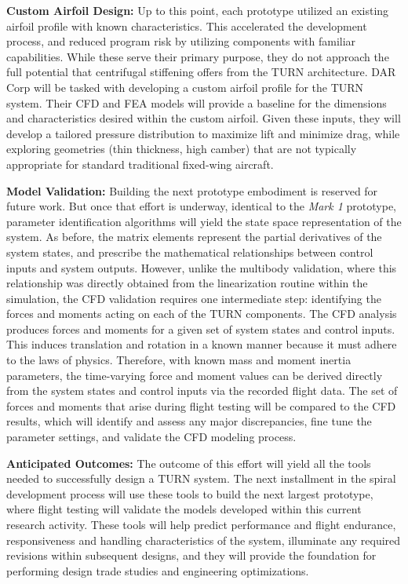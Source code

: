 \documentclass[11pt]{article}
\begin{document}
{\color{green} \bf Custom Airfoil Design:}
Up to this point, each prototype utilized an existing airfoil profile with known characteristics.  This accelerated the development process, and reduced program risk by utilizing components with familiar capabilities.  While these serve their primary purpose, they do not approach the full potential that centrifugal stiffening offers from the TURN architecture.  DAR Corp will be tasked with developing a custom airfoil profile for the TURN system.  Their CFD and FEA models will provide a baseline for the dimensions and characteristics desired within the custom airfoil.  Given these inputs, they will develop a tailored pressure distribution to maximize lift and minimize drag, while exploring geometries (thin thickness, high camber) that are not typically appropriate for standard traditional fixed-wing aircraft.


{\color{green} \bf Model Validation:}
Building the next prototype embodiment is reserved for future work.  But once that effort is underway, identical to the \emph{Mark 1} prototype, parameter identification algorithms will yield the state space representation of the system.  As before, the matrix elements represent the partial derivatives of the system states, and prescribe the mathematical relationships between control inputs and system outputs.  However, unlike the multibody validation, where this relationship was directly obtained from the linearization routine within the simulation, the CFD validation requires one intermediate step: identifying the forces and moments acting on each of the TURN components.  The CFD analysis produces forces and moments for a given set of system states and control inputs.  This induces translation and rotation in a known manner because it must adhere to the laws of physics.  Therefore, with known mass and moment inertia parameters, the time-varying force and moment values can be derived directly from the system states and control inputs via the recorded flight data.  The set of forces and moments that arise during flight testing will be compared to the CFD results, which will identify and assess any major discrepancies, fine tune the parameter settings, and validate the CFD modeling process.


{\color{green} \bf Anticipated Outcomes:}
The outcome of this effort will yield all the tools needed to successfully design a TURN system.  The next installment in the spiral development process will use these tools to build the next largest prototype, where flight testing will validate the models developed within this current research activity.  These tools will help predict performance and flight endurance, responsiveness and handling characteristics of the system, illuminate any required revisions within subsequent designs, and they will provide the foundation for performing design trade studies and engineering optimizations.
\end{document}

